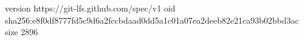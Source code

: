 version https://git-lfs.github.com/spec/v1
oid sha256:e8f0df8777fd5c9d6a2fccbdaad0dd5a1c01a07ea2deeb82e21ca93b02bbd3ac
size 2896
